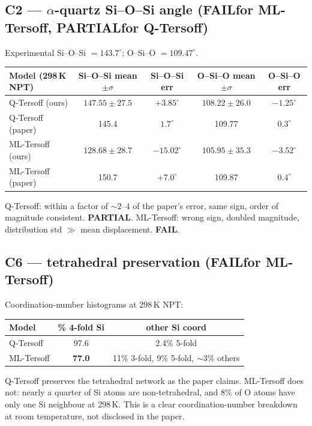 \documentclass[11pt]{article}
\newcommand{\FAIL}[0]{{\color{red!70!black}\textbf{FAIL}}}
\newcommand{\PARTIAL}[0]{{\color{orange!80!black}\textbf{PARTIAL}}}
\begin{document}
\subsection{C2 --- $\alpha$-quartz Si--O--Si angle (\FAIL for ML-Tersoff, \PARTIAL for Q-Tersoff)}
Experimental Si--O--Si $= 143.7^{\circ}$; O--Si--O $= 109.47^{\circ}$.
\begin{center}
\begin{tabular}{lcccc}
\toprule
Model (298\,K NPT) & Si--O--Si mean $\pm\sigma$ & Si--O--Si err & O--Si--O mean $\pm\sigma$ & O--Si--O err \\
\midrule
Q-Tersoff (ours)    & $147.55 \pm 27.5$ & $+3.85^{\circ}$ & $108.22 \pm 26.0$ & $-1.25^{\circ}$ \\
Q-Tersoff (paper)   & 145.4             & $1.7^{\circ}$   & 109.77            & $0.3^{\circ}$   \\
ML-Tersoff (ours)   & $128.68 \pm 28.7$ & $\mathbf{-15.02^{\circ}}$ & $105.95 \pm 35.3$ & $-3.52^{\circ}$ \\
ML-Tersoff (paper)  & 150.7             & $+7.0^{\circ}$  & 109.87            & $0.4^{\circ}$   \\
\bottomrule
\end{tabular}
\end{center}
Q-Tersoff: within a factor of $\sim 2$--$4$ of the paper's error, same sign, order of magnitude consistent. \PARTIAL.
ML-Tersoff: wrong sign, doubled magnitude, distribution std $\gg$ mean displacement. \FAIL.

\subsection{C6 --- tetrahedral preservation (\FAIL for ML-Tersoff)}
Coordination-number histograms at 298\,K NPT:
\begin{center}
\begin{tabular}{lcc}
\toprule
Model & \% 4-fold Si & other Si coord \\
\midrule
Q-Tersoff  & 97.6 & 2.4\% 5-fold \\
ML-Tersoff & \textbf{77.0} & 11\% 3-fold, 9\% 5-fold, $\sim 3\%$ others \\
\bottomrule
\end{tabular}
\end{center}
Q-Tersoff preserves the tetrahedral network as the paper claims. ML-Tersoff does not: nearly a quarter of Si atoms are non-tetrahedral, and 8\% of O atoms have only one Si neighbour at 298\,K. This is a clear coordination-number breakdown at room temperature, not disclosed in the paper.
\end{document}
